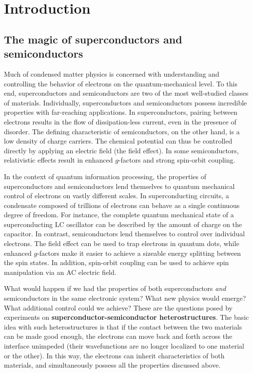 \chapter[Introduction]{Introduction\label{ch:1_Introduction}}

\section{The magic of superconductors and semiconductors}

Much of condensed matter physics is concerned with understanding and controlling the behavior of electrons on the quantum\hyp{}mechanical level. 
To this end, superconductors and semiconductors are two of the most well\hyp{}studied classes of materials.
Individually, superconductors and semiconductors possess incredible properties with far\hyp{}reaching applications. 
In superconductors, pairing between electrons results in the flow of dissipation\hyp{}less current, even in the presence of disorder.  
The defining characteristic of semiconductors, on the other hand, is a low density of charge carriers.
The chemical potential can thus be controlled directly by applying an electric field (the field effect).  
In some semiconductors, relativistic effects result in enhanced $g$\hyp{}factors and strong spin\hyp{}orbit coupling.

In the context of quantum information processing, the properties of superconductors and semiconductors lend themselves to quantum mechanical control of electrons on vastly different scales. 
In superconducting circuits, a condensate composed of trillions of electrons can behave as a single continuous degree of freedom. 
For instance, the complete quantum mechanical state of a superconducting LC oscillator can be described by the amount of charge on the capacitor.
In contrast, semiconductors lend themselves to control over individual electrons. 
The field effect can be used to trap electrons in quantum dots, while enhanced $g$\hyp{}factors make it easier to achieve a sizeable energy splitting between the spin states. 
In addition, spin\hyp{}orbit coupling can be used to achieve spin manipulation via an AC electric field. 

What would happen if we had the properties of both superconductors \textit{and} semiconductors in the same electronic system? 
What new physics would emerge? 
What additional control could we achieve? 
These are the questions posed by experiments on  \textbf{superconductor\hyp{}semiconductor heterostructures}. 
The basic idea with such heterostructures is that if the contact between the two materials can be made good enough, the electrons can move back and forth across the interface unimpeded (their wavefunctions are no longer localized to one material or the other). 
In this way, the electrons can inherit characteristics of both materials, and simultaneously possess all the properties discussed above. 

